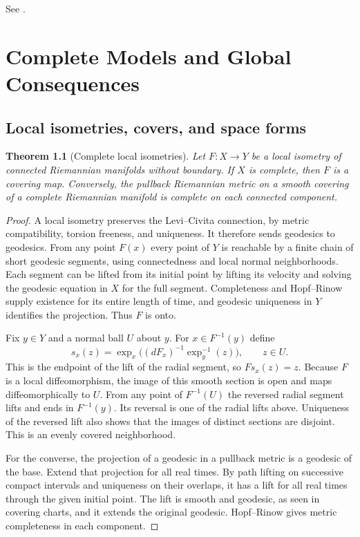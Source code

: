 \documentclass[11pt,oneside,openany]{book}
\theoremstyle{plain}
\newtheorem{theorem}{Theorem}[chapter]
\theoremstyle{definition}
\theoremstyle{remark}
\begin{document}
See \cite[Chapter 11, Theorem 11.19]{LeeRM}.

\chapter{Complete Models and Global Consequences}
\label{ch:p202-global-geometry}

\section{Local isometries, covers, and space forms}
\label{p202:G22}

\begin{theorem}[Complete local isometries]\label{thm:p202-complete-cover}
Let \(F:X\to Y\) be a local isometry of connected Riemannian
manifolds without boundary. If \(X\) is complete, then \(F\)
is a covering map. Conversely, the pullback Riemannian metric
on a smooth covering of a complete Riemannian manifold is
complete on each connected component.
\end{theorem}

\begin{proof}
A local isometry preserves the Levi--Civita connection, by
metric compatibility, torsion freeness, and uniqueness.
It therefore sends geodesics to geodesics. From any point
\(F(x)\) every point of \(Y\) is reachable by a finite chain
of short geodesic segments, using connectedness and local
normal neighborhoods. Each segment can be lifted from its
initial point by lifting its velocity and solving the geodesic
equation in \(X\) for the full segment. Completeness and
Hopf--Rinow supply existence for its entire length of time,
and geodesic uniqueness in \(Y\) identifies the projection.
Thus \(F\) is onto.

Fix \(y\in Y\) and a normal ball \(U\) about \(y\). For
\(x\in F^{-1}(y)\) define
\[
 s_x(z)=\exp_x\big((dF_x)^{-1}\exp_y^{-1}(z)\big),
 \qquad z\in U.
\]
This is the endpoint of the lift of the radial segment, so
\(F s_x(z)=z\). Because \(F\) is a local diffeomorphism, the
image of this smooth section is open and maps diffeomorphically
to \(U\). From any point of \(F^{-1}(U)\) the reversed radial
segment lifts and ends in \(F^{-1}(y)\). Its reversal is one of
the radial lifts above. Uniqueness of the reversed lift also
shows that the images of distinct sections are disjoint. This
is an evenly covered neighborhood.

For the converse, the projection of a geodesic in a pullback
metric is a geodesic of the base. Extend that projection for
all real times. By path lifting on successive compact
intervals and uniqueness on their overlaps, it has a lift
for all real times through the given initial point. The lift
is smooth and geodesic, as seen in covering charts, and it
extends the original geodesic. Hopf--Rinow gives metric
completeness in each component.
\end{proof}
\end{document}

